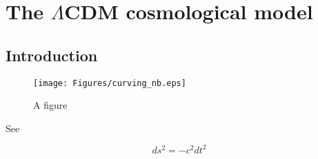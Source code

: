 
\chapter{The $\Lambda$CDM cosmological model}
\lhead[\fancyplain{}{\thepage}]{\fancyplain{}{\rightmark}}
 \thispagestyle{plain}
\setlength{\parindent}{10mm}


\section{Introduction}

\citep{NbodySample}
\begin{figure}
\texttt{[image: Figures/curving\_nb.eps]}
\caption{A figure}
\label{1:fig1}
\end{figure}

See \citep{Dodelson-Cosmology-2003}

\begin{equation}
\label{eq:1:frw}
ds^2 = -c^2dt^2
\end{equation}

%